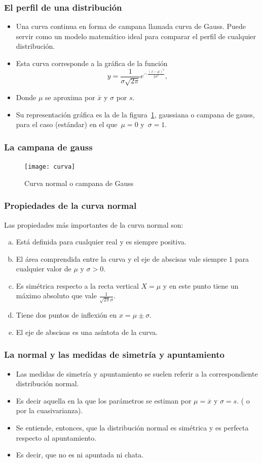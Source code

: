 \begin{frame}
\frametitle{El perfil de una distribución}
\begin{itemize}
\item Una curva continua en forma de campana llamada curva de Gauss. Puede servir como un modelo
matemático ideal para comparar el perfil de cualquier distribución.
\item  Esta curva
corresponde a la gráfica de la función
$$y=\frac{1}{\sigma\sqrt{2\pi}} e^{-\frac{(x-\mu)^2}{2\sigma^2}},$$
\item Donde  $\mu$ se aproxima por $\overline{x}$  y  $\sigma$ por $s$.
\item Su representación gráfica es la de la figura~\ref{NORMAL}, gaussiana o campana de gauss, para el caso (estándar) en el  que~$\mu=0$ y~$\sigma =1$.
\end{itemize}
\end{frame}

\begin{frame}
\frametitle{La campana de gauss}
\begin{figure}
\begin{center}
\texttt{[image: curva]}
\end{center} \caption{Curva normal o campana de Gauss} \label{NORMAL}
\end{figure}
\end{frame}

\begin{frame}
\frametitle{Propiedades de la curva normal}
Las propiedades más importantes de la curva normal son:
\begin{enumerate}[a)]
\item Está definida para cualquier real  y es siempre positiva.
\item El área comprendida entre  la curva y el eje de abscisas
vale siempre $1$ para cualquier valor de $\mu$ y $\sigma>0$.
\item Es simétrica respecto a la recta vertical $X=\mu$ y en este punto
tiene un máximo absoluto que vale $\frac{1}{\sqrt{2 \pi} \sigma}$.
\item Tiene dos puntos de inflexión en $x=\mu \pm \sigma$.
\item El eje de abscisas es una asíntota de la curva.
\end{enumerate}
\end{frame}

\begin{frame}
\frametitle{La normal y las medidas de simetría y apuntamiento}
\begin{itemize}
\item Las medidas de simetría y apuntamiento se suelen referir a la correspondiente
distribución normal.
\item Es decir  aquella en la que los parámetros se estiman por  $\mu=\overline{x}$
y $\sigma=s.$ ( o por la cuasivarianza).
\item Se entiende, entonces, que la distribución normal es simétrica y es perfecta respecto 
al apuntamiento.
\item  Es decir, que no es ni apuntada ni chata.
\end{itemize}
\end{frame}


